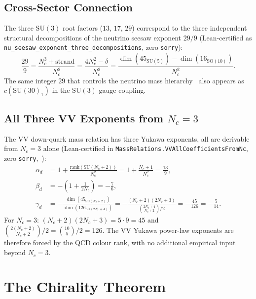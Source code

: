 \documentclass[11pt]{article}
\theoremstyle{remark}
\newcommand{\Nc}{N_c}
\newcommand{\ddelta}{\delta}
\begin{document}
\subsection{Cross-Sector Connection}

The three $\mathrm{SU}(3)$ root factors ($13$, $17$, $29$) correspond to the three
independent structural decompositions of the neutrino seesaw exponent $29/9$
(Lean-certified as \texttt{nu\_see\-saw\_ex\-po\-nent\_three\_de\-com\-po\-si\-tions},
zero \texttt{sorry}):
\[
  \frac{29}{9} = \frac{\Nc^3 + \mathrm{strand}}{\Nc^2}
              = \frac{4\Nc^2 - \ddelta}{\Nc^2}
              = \frac{\dim(45_{\mathrm{SU}(5)}) - \dim(16_{\mathrm{SO}(10)})}{\Nc^2}.
\]
The same integer $29$ that controls the neutrino mass hierarchy~\cite{SpivackNeutrino}
also appears as $c(\mathrm{SU}(30)_1)$ in the $\mathrm{SU}(3)$ gauge coupling.

\subsection{All Three VV Exponents from $\Nc = 3$}
\label{subsec:vv_complete}

The VV down-quark mass relation has three Yukawa exponents, all are derivable from
$\Nc = 3$ alone (Lean-certified in \texttt{MassRelations.VVAllCoefficientsFromNc},
zero \texttt{sorry},~\cite{ugp-lean}):
\begin{align*}
  \alpha_d &= 1 + \tfrac{\mathrm{rank}(\mathrm{SU}(\Nc{+}2))}{\Nc^2}
            = 1 + \tfrac{\Nc+1}{\Nc^2} = \tfrac{13}{9}, \\
  \beta_d  &= -\!\left(1 + \tfrac{1}{2\Nc}\right) = -\tfrac{7}{6}, \\
  \gamma_d &= -\tfrac{\dim(45_{\mathrm{SU}(\Nc+2)})}{\dim(126_{\mathrm{SO}(2\Nc+4)})}
            = -\tfrac{(\Nc{+}2)(2\Nc{+}3)}{\binom{2\Nc+4}{\Nc+2}/2}
            = -\tfrac{45}{126} = -\tfrac{5}{14}.
\end{align*}
For $\Nc = 3$: $(\Nc{+}2)(2\Nc{+}3) = 5 \cdot 9 = 45$ and
$\binom{2(\Nc{+}2)}{\Nc{+}2}/2 = \binom{10}{5}/2 = 126$.
The VV Yukawa power-law exponents are therefore forced by the QCD colour rank,
with no additional empirical input beyond $\Nc = 3$.

\section{The Chirality Theorem}
\label{sec:chirality}
\end{document}
